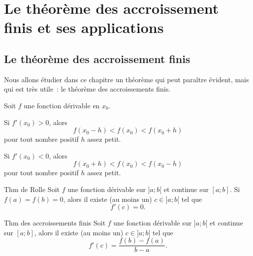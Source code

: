 \documentclass[a4paper,12pt]{article}
\begin{document}
\section{Le théorème des accroissement finis et ses applications}

\subsection{Le théorème des accroissement finis}
Nous allons étudier dans ce chapitre un théorème qui peut paraître évident, mais qui est très utile~: le théorème des accroissements finis. 
\medskip

\begin{prop}
	\tcblower
Soit $f$ une fonction dérivable en $x_0$. 

Si $f'(x_0)>0$, alors
\[f(x_0-h)<f(x_0)<f(x_0+h)\]
pour tout nombre positif $h$ assez petit. 

Si $f'(x_0)<0$, alors
\[f(x_0+h)<f(x_0)<f(x_0-h)\]
pour tout nombre positif $h$ assez petit. 
\end{prop}

\begin{thm}
	Thm de Rolle
	\tcblower
	Soit $f$ une fonction dérivable sur $] a;b[$ et continue sur $[a;b]$. Si $f(a)=f(b)=0$, alors il existe (au moins un) $c\in] a;b[$ tel que 
	\[f'(c)=0.\]
\end{thm}
\begin{thm}
	Thm des accroissements finis
	\tcblower
	Soit $f$ une fonction dérivable sur $] a;b[$ et continue sur $[a;b]$, alors il existe (au moins un) $c\in ]a;b[$ tel que 
	\[f'(c)=\dfrac{f(b)-f(a)}{b-a}.\]
\end{thm}
\end{document}
